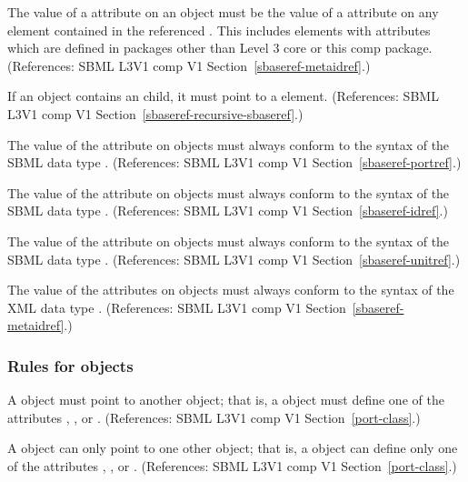 \begin{sbmlenum}
 { The value of a  attribute on an \SBaseRef
  object must be the value of a  attribute on any element
  contained in the referenced \Model.  This includes elements with 
  attributes which are defined in packages other than Level 3 core or
  this comp package. 
  (References: SBML L3V1 comp V1 Section~\ref{sbaseref-metaidref}.) }


 { If an \SBaseRef object contains an \SBaseRef child,
  it must point to a \Submodel element. 
  (References: SBML L3V1 comp V1 Section~\ref{sbaseref-recursive-sbaseref}.) }


 { The value of the  attribute 
  on \SBaseRef objects must always conform to the syntax of
  the SBML data type .
  (References: SBML L3V1 comp V1 Section~\ref{sbaseref-portref}.) }


 { The value of the 
  attribute on \SBaseRef objects must always conform to the syntax of
  the SBML data type .
  (References: SBML L3V1 comp V1 Section~\ref{sbaseref-idref}.) }


 { The value of the  attribute on
  \SBaseRef objects must always conform to the syntax of the SBML data
  type .
  (References: SBML L3V1 comp V1 Section~\ref{sbaseref-unitref}.) }


 { The value of the  attributes on
  \SBaseRef objects must always conform to the syntax of the XML data
  type .
  (References: SBML L3V1 comp V1 Section~\ref{sbaseref-metaidref}.) }


\end{sbmlenum} \subsubsection*{Rules for  objects} \begin{sbmlenum}

 { A \Port object must point to another object; that is,
  a \Port object must define one of the attributes 
  , , or . 
  (References: SBML L3V1 comp V1 Section~\ref{port-class}.) }


 { A \Port object can only point to one other object; that is,
  a \Port object can define only one of the attributes 
  , , or .
  (References: SBML L3V1 comp V1 Section~\ref{port-class}.) }



\end{sbmlenum}
